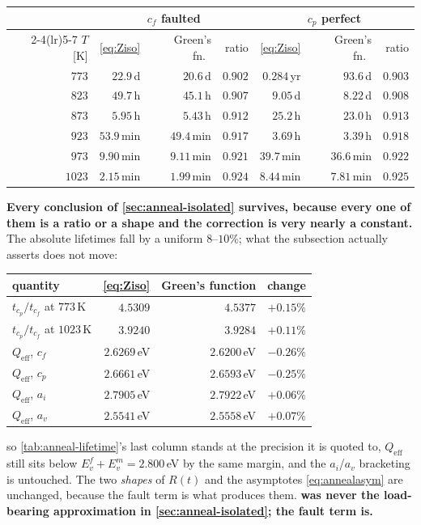 \documentclass{article}
\begin{document}
\begin{center}\small
\begin{tabular}{@{}r rrr rrr@{}}
\toprule
& \multicolumn{3}{c}{$c_f$ faulted} & \multicolumn{3}{c}{$c_p$ perfect}\\
\cmidrule(lr){2-4}\cmidrule(lr){5-7}
$T$ [K] & \cref{eq:Ziso} & Green's fn.\ & ratio
        & \cref{eq:Ziso} & Green's fn.\ & ratio\\
\midrule
$773$  & $22.9\,$d   & $20.6\,$d   & $0.902$ & $0.284\,$yr & $93.6\,$d   & $0.903$\\
$823$  & $49.7\,$h   & $45.1\,$h   & $0.907$ & $9.05\,$d   & $8.22\,$d   & $0.908$\\
$873$  & $5.95\,$h   & $5.43\,$h   & $0.912$ & $25.2\,$h   & $23.0\,$h   & $0.913$\\
$923$  & $53.9\,$min & $49.4\,$min & $0.917$ & $3.69\,$h   & $3.39\,$h   & $0.918$\\
$973$  & $9.90\,$min & $9.11\,$min & $0.921$ & $39.7\,$min & $36.6\,$min & $0.922$\\
$1023$ & $2.15\,$min & $1.99\,$min & $0.924$ & $8.44\,$min & $7.81\,$min & $0.925$\\
\bottomrule
\end{tabular}
\end{center}

\textbf{Every conclusion of \cref{sec:anneal-isolated} survives, because every one
of them is a ratio or a shape and the correction is very nearly a constant.} The
absolute lifetimes fall by a uniform $8$--$10\%$; what the subsection actually
asserts does not move:
\begin{center}\small
\begin{tabular}{@{}l rrr@{}}
\toprule
quantity & \cref{eq:Ziso} & Green's function & change\\
\midrule
$t_{c_p}/t_{c_f}$ at $773\,$K & $4.5309$ & $4.5377$ & $+0.15\%$\\
$t_{c_p}/t_{c_f}$ at $1023\,$K & $3.9240$ & $3.9284$ & $+0.11\%$\\
$Q_{\mathrm{eff}}$, $c_f$ & $2.6269\,$eV & $2.6200\,$eV & $-0.26\%$\\
$Q_{\mathrm{eff}}$, $c_p$ & $2.6661\,$eV & $2.6593\,$eV & $-0.25\%$\\
$Q_{\mathrm{eff}}$, $a_i$ & $2.7905\,$eV & $2.7922\,$eV & $+0.06\%$\\
$Q_{\mathrm{eff}}$, $a_v$ & $2.5541\,$eV & $2.5558\,$eV & $+0.07\%$\\
\bottomrule
\end{tabular}
\end{center}
so \cref{tab:anneal-lifetime}'s last column stands at the precision it is quoted
to, $Q_{\mathrm{eff}}$ still sits below $E^f_v+E^m_v=2.800\,$eV by the same
margin, and the $a_i$/$a_v$ bracketing is untouched. The two \emph{shapes} of
$R(t)$ and the asymptotes \cref{eq:annealasym} are unchanged, because the fault
term is what produces them. \textbf{ was never the load-bearing
approximation in \cref{sec:anneal-isolated}; the fault term is.}
\end{document}
